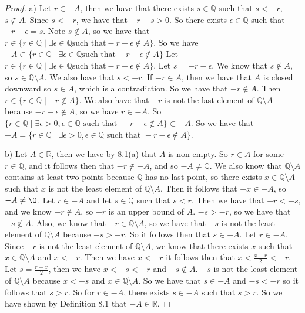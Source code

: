 \documentclass[12pt]{article}
\newcommand{\bbQ}{\mathbb{Q}}
\newcommand{\bbR}{\mathbb{R}}
\renewcommand{\emptyset}{\O}
\renewcommand{\_}[1]{\underline{ #1 }}
\theoremstyle{definition}
\numberwithin{equation}{subsection}
\begin{document}
\begin{proof}
a) Let $r \in -A$, then we have that there exists $s \in \bbQ$ such that $s < -r$, $s \not \in A$. Since $s < -r$, we have that $-r - s > 0$. So there exists $\epsilon \in \bbQ$ such that $-r - \epsilon = s$. Note $s \not \in A$, so we have that $r \in \{r \in \bbQ \mid \exists \epsilon \in \bbQ \text{such that} -r - \epsilon \not \in A\}$. So we have $-A \subset \{r \in \bbQ \mid \exists \epsilon \in \bbQ \text{such that} -r - \epsilon \not \in A\}$ \newline
Let $r \in  \{r \in \bbQ \mid \exists \epsilon \in \bbQ \text{such that} -r - \epsilon \not \in A\}$. Let $s = -r -\epsilon$. We know that $s \not \in A$, so $s \in \bbQ \setminus A$. We also have that $s < -r$. If $-r \in A$, then we have that $A$ is closed downward so $s \in A$, which is a contradiction. So we have that $-r \not \in A$. Then $r \in \{r \in \bbQ \mid -r \not \in A\}$. We also have that $-r$ is not the last element of $\bbQ \setminus A$ because $-r - \epsilon \not \in A$, so we have $r \in -A$. So $\{r\in\bbQ\mid\exists \epsilon>0, \epsilon\in\bbQ\text{ such that } -r-\epsilon\not\in A\} \subset -A$. \newline
So we have that $-A = \{r\in\bbQ\mid\exists \epsilon>0, \epsilon\in\bbQ\text{ such that } -r-\epsilon\not\in A\}$.

b) Let $A \in \bbR$, then we have by 8.1(a) that $A$ is non-empty. So $r \in A$ for some $r \in \bbQ$, and it follows then that $-r \not \in -A$, and so $-A \not = \bbQ$. \newline
We also know that $\bbQ \setminus A$ contains at least two points because $\bbQ$ has no last point, so there exists $x \in \bbQ \setminus A$ such that $x$ is not the least element of $\bbQ \setminus A$. Then it follows that $-x \in -A$, so $-A \not = \emptyset$. \newline
Let $r \in -A$ and let $s \in \bbQ$ such that $s < r$. Then we have that $-r < -s$, and we know $-r \not \in A$, so $-r$ is an upper bound of $A$. $-s > -r$, so we have that $-s \not \in A$. Also, we know that $-r \in \bbQ \setminus A$, so we have that $-s$ is not the least element of $\bbQ \setminus A$ because $-s > -r$. So it follows then that $s \in -A$. \newline
Let $r \in -A$. Since $-r$ is not the least element of $\bbQ \setminus A$, we know that there exists $x$ such that $x \in \bbQ \setminus A$ and $x < -r$. Then we have $x < -r$ it follows then that $x < \frac{x - r}{2} < -r$. Let $s = \frac{r - x}{2}$, then we have $x < -s < -r$ and $-s \not \in A$. $-s$ is not the least element of $\bbQ \setminus A$ because $x < -s$ and $x \in \bbQ \setminus A$. So we have that $s \in -A$ and $-s < -r$ so it follows that $s > r$. So for $r \in -A$, there exists $s \in -A$ such that $s > r$. \newline
So we have shown by Definition 8.1 that $-A \in \bbR$.


\end{proof}
\end{document}
